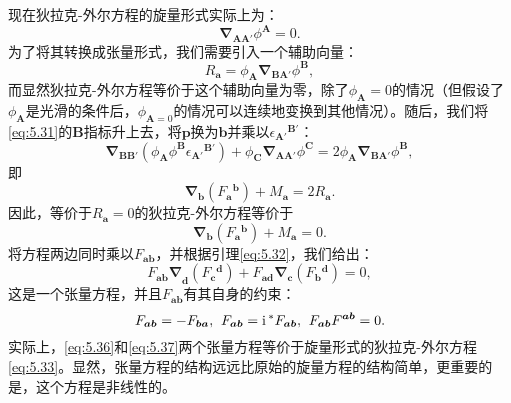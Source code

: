 现在狄拉克-外尔方程的旋量形式实际上为\parencite{noauthor_relativistic_1936}：
\begin{equation}
	\boldsymbol{\nabla }_{\boldsymbol{AA} '} \phi ^{\boldsymbol{A}} =0.
	\label{eq:5.33}
\end{equation}
为了将其转换成张量形式，我们需要引入一个辅助向量：
\begin{equation}
	R_{\boldsymbol{a}} =\phi _{\boldsymbol{A}}\boldsymbol{\nabla }_{\boldsymbol{BA} '} \phi ^{\boldsymbol{B}} ,
	\label{eq:5.34}
\end{equation}
而显然狄拉克-外尔方程等价于这个辅助向量为零，除了$\phi _{\boldsymbol{A}} =0$的情况（但假设了$\phi _{\boldsymbol{A}}$是光滑的条件后，$\phi _{\boldsymbol{A} =0}$的情况可以连续地变换到其他情况）。随后，我们将\ref{eq:5.31}的$\boldsymbol{B}$指标升上去，将$\boldsymbol{p}$换为$\boldsymbol{b}$并乘以$\epsilon {_{\boldsymbol{A} '}}^{\boldsymbol{B} '}$：
\begin{equation*}
	\boldsymbol{\nabla }_{\boldsymbol{BB} '} (\phi _{\boldsymbol{A}} \phi ^{\boldsymbol{B}} \epsilon {_{\boldsymbol{A} '}}^{\boldsymbol{B} '} )+\phi _{\boldsymbol{C}}\boldsymbol{\nabla }_{\boldsymbol{AA} '} \phi ^{\boldsymbol{C}} =2\phi _{\boldsymbol{A}}\boldsymbol{\nabla }_{\boldsymbol{BA} '} \phi ^{\boldsymbol{B}} ,
\end{equation*}
即
\begin{equation}
	\boldsymbol{\nabla }_{\boldsymbol{b}} (F{_{\boldsymbol{a}}}^{\boldsymbol{b}} )+M_{\boldsymbol{a}} =2R_{\boldsymbol{a}} .
	\label{eq:5.35}
\end{equation}
因此，等价于$R_{\boldsymbol{a}} =0$的狄拉克-外尔方程等价于
\begin{equation*}
	\boldsymbol{\nabla }_{\boldsymbol{b}} (F{_{\boldsymbol{a}}}^{\boldsymbol{b}} )+M_{\boldsymbol{a}} =0.
\end{equation*}
将方程两边同时乘以$F_{\boldsymbol{ab}}$，并根据引理\ref{eq:5.32}，我们给出：
\begin{equation}
	F\boldsymbol{_{\boldsymbol{ab}} \nabla }_{\boldsymbol{d}} (F{_{\boldsymbol{c}}}^{\boldsymbol{d}} )+F_{\boldsymbol{ad}}\boldsymbol{\nabla }_{\boldsymbol{c}} (F{_{\boldsymbol{b}}}^{\boldsymbol{d}} )=0,
	\label{eq:5.36}
\end{equation}
这是一个张量方程，并且$F_{\boldsymbol{ab}}$有其自身的约束：
\begin{equation}
	F_{\boldsymbol{ab}} =-F_{\boldsymbol{ba}} ,\kern+0.4em F_{\boldsymbol{ab}} =\mathrm{i}\prescript{*}{}{} F_{\boldsymbol{ab}} ,\kern+0.4em F_{\boldsymbol{ab}} F^{\boldsymbol{ab}} =0.
	\label{eq:5.37}
\end{equation}
实际上，\ref{eq:5.36}和\ref{eq:5.37}两个张量方程等价于旋量形式的狄拉克-外尔方程\ref{eq:5.33}。显然，张量方程的结构远远比原始的旋量方程的结构简单，更重要的是，这个方程是非线性的。




